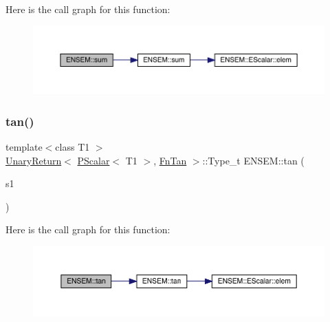 Here is the call graph for this function\+:\nopagebreak
\begin{figure}[H]
\begin{center}
\leavevmode
\includegraphics[width=350pt]{db/dcc/group__primscalar_gaa2733f98f3fc41be9ea11939aa1ee01b_cgraph}
\end{center}
\end{figure}
\mbox{\label{group__primscalar_gac184e021b0af3d450c4db8f1a8fd75dc}} 
\subsubsection{\texorpdfstring{tan()}{tan()}}
{\footnotesize\ttfamily template$<$class T1 $>$ \\
\mbox{\hyperlink{structENSEM_1_1UnaryReturn}{Unary\+Return}}$<$ \mbox{\hyperlink{classENSEM_1_1PScalar}{P\+Scalar}}$<$ T1 $>$, \mbox{\hyperlink{structENSEM_1_1FnTan}{Fn\+Tan}} $>$\+::Type\+\_\+t E\+N\+S\+E\+M\+::tan (\begin{DoxyParamCaption}\item[{const \mbox{\hyperlink{classENSEM_1_1PScalar}{P\+Scalar}}$<$ T1 $>$ \&}]{s1 }\end{DoxyParamCaption})\hspace{0.3cm}{\ttfamily [inline]}}

Here is the call graph for this function\+:\nopagebreak
\begin{figure}[H]
\begin{center}
\leavevmode
\includegraphics[width=350pt]{db/dcc/group__primscalar_gac184e021b0af3d450c4db8f1a8fd75dc_cgraph}
\end{center}
\end{figure}
\mbox{\label{group__primscalar_ga70f6abe538ba4ee394447d572f919fc0}} 
